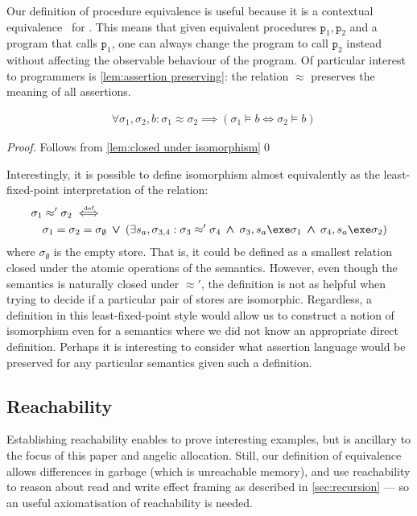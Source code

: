 \documentclass[runningheads,a4paper]{llncs}
\DeclareMathOperator{\band}{\bm{\;\land\;}}
\DeclareMathOperator{\bor}{\bm{\;\lor\;}}
\DeclareMathOperator{\suchthat}{:}
\newcommand*{\qvars}[2]{#1_{#2}}
\newcommand*{\defiff}{\stackrel{\text{\tiny def}}{\iff}}
\newcommand*\iso{\approx}
\newcommand*{\fun}{\texttt{p}}
\newcommand*{\store}{\sigma}
\newcommand*{\isoref}{\hyperref[def:global isomorphism]{\ensuremath{\iso}}}
\begin{document}
Our definition of procedure equivalence is useful because it is a contextual equivalence~\cite{Milner1977} for \lang{}. This means that given equivalent procedures $\fun_1,\fun_2$ and a program that calls $\fun_1$, one can always change the program to call $\fun_2$ instead without affecting the observable behaviour of the program.  Of particular interest to programmers is \cref{lem:assertion preserving}: the relation \isoref{} preserves the meaning of all assertions.

\begin{corollary}\label{lem:assertion preserving}
	\[\begin{aligned}
		&\forall \store_1,\store_2,b \suchthat \store_1 \iso \store_2  \implies (\store_1\vDash{b} \iff \store_2\vDash{b})
	\end{aligned}\]
\end{corollary}
\begin{proof}Follows from \cref{lem:closed under isomorphism}\qed\end{proof}

Interestingly, it is possible to define isomorphism almost equivalently as the least-fixed-point interpretation of the relation:
\[\begin{aligned}
&	\store_1\iso'\store_2 \defiff \\
&\quad		\store_1=\store_2=\store_\emptyset \bor
		\left(\exists s_a,\qvars{\store}{3,4} : \store_3\iso'\store_4 \band \store_3,s_a\exe\store_1 \band \store_4,s_a\exe\store_2\right)
\end{aligned}\]
where $\store_\emptyset$ is the empty store. That is, it could be defined as a smallest relation closed under the atomic operations of the semantics. However, even though the semantics is naturally closed under $\iso'$, the definition is not as helpful when trying to decide if a particular pair of stores are isomorphic. Regardless, a definition in this least-fixed-point style would allow us to construct a notion of isomorphism even for a semantics where we did not know an appropriate direct definition. Perhaps it is interesting to consider what assertion language would be preserved for any particular semantics given such a definition.

\subsection{Reachability}\label{sec:reachability}

Establishing reachability enables \tool{} to prove interesting examples, but is ancillary to the focus of this paper \metho{} and angelic allocation. Still, our definition of equivalence allows differences in garbage (which is unreachable memory), and \tool{} use reachability to reason about read and write effect framing as described in \cref{sec:recursion} --- so an useful axiomatisation of reachability is needed.
\end{document}
